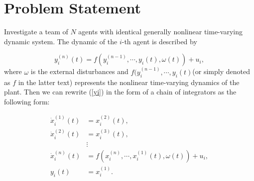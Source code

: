 \documentclass[english]{cccconf}
\newtheorem{lemma}{Lemma}
\begin{document}











\section{Problem Statement}

Investigate a team of $N$ agents with identical generally nonlinear time-varying dynamic system. The dynamic of the $i$-th agent is described by

\begin{equation}
  \label{yi}
  y_i^{(n)}(t) = f(y_i^{(n-1)},\cdots,y_i(t),\omega(t))+u_i,
\end{equation}where $\omega$ is the external disturbances and $f(y_i^{(n-1)},\cdots, y_i(t)$(or simply denoted as $f$ in the latter text) represents the nonlinear time-varying dynamics of the plant. Then we can rewrite (\ref{yi}) in the form of a chain of integrators as the following form:



\begin{equation}
  \label{ss1}
  \begin{aligned}
  \dot x_i^{(1)}(t) &= x_i^{(2)}(t),\\
  \dot x_i^{(2)}(t) &= x_i^{(3)}(t),\\
  & \vdots \\
  \dot x_i^{(n)}(t) &= f(x_i^{(n)},\cdots, x_i^{(1)}(t),\omega(t))+u_i,\\
  y_i(t) &= x_i^{(1)}.
  \end{aligned}
\end{equation}%
\end{document}
